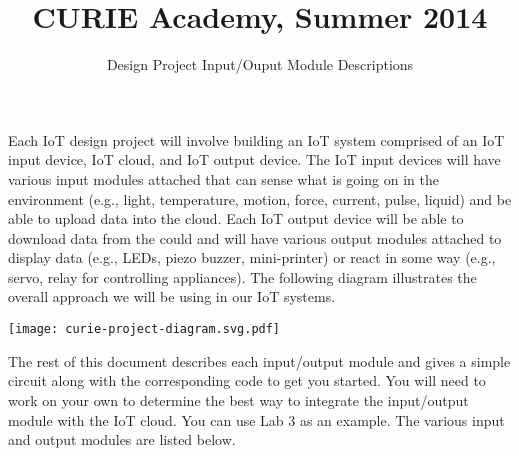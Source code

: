 \documentclass{cbxdoc}
\title{CURIE Academy, Summer 2014}
\subtitle{Design Project Input/Ouput Module Descriptions}
\makeatletter
\renewcommand\tableofcontents{%
    \@starttoc{toc}%
}
\makeatother
\begin{document}
\maketitle

Each IoT design project will involve building an IoT system comprised of
an IoT input device, IoT cloud, and IoT output device. The IoT input
devices will have various input modules attached that can sense what is
going on in the environment (e.g., light, temperature, motion, force,
current, pulse, liquid) and be able to upload data into the cloud. Each
IoT output device will be able to download data from the could and will
have various output modules attached to display data (e.g., LEDs, piezo
buzzer, mini-printer) or react in some way (e.g., servo, relay for
controlling appliances). The following diagram illustrates the overall
approach we will be using in our IoT systems.

\begin{center}
  \texttt{[image: curie-project-diagram.svg.pdf]}
\end{center}

The rest of this document describes each input/output module and gives a
simple circuit along with the corresponding code to get you started. You
will need to work on your own to determine the best way to integrate the
input/output module with the IoT cloud. You can use Lab 3 as an example.
The various input and output modules are listed below.

\begin{center}\small
 \begin{minipage}{0.8\textwidth}
   \tableofcontents
 \end{minipage}
\end{center}

















\end{document}
